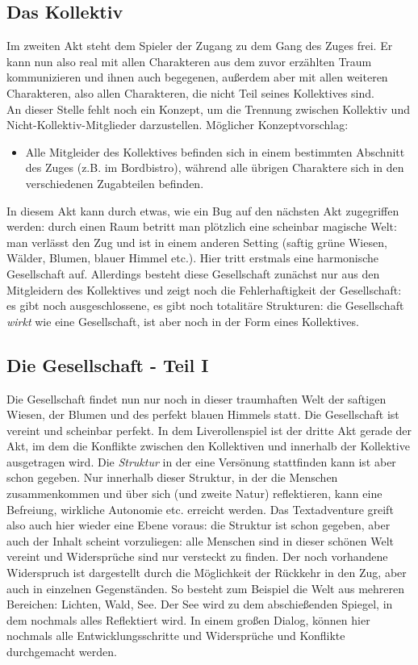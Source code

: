 \documentclass[a4paper, 12pt]{scrartcl}
\begin{document}
    \subsection{Das Kollektiv} \label{das-kollektiv}
    Im zweiten Akt steht dem Spieler der Zugang zu dem Gang des Zuges frei. 
    Er kann nun also real mit allen Charakteren aus dem zuvor erzählten Traum kommunizieren und ihnen auch begegenen, außerdem aber mit allen weiteren Charakteren, also allen Charakteren, die nicht Teil seines Kollektives sind. \\
    An dieser Stelle fehlt noch ein Konzept, um die Trennung zwischen Kollektiv und Nicht-Kollektiv-Mitglieder darzustellen.
    Möglicher Konzeptvorschlag:
    \begin{itemize}
    \item[] Alle Mitgleider des Kollektives befinden sich in einem bestimmten Abschnitt des Zuges (z.B. im Bordbistro), während alle übrigen Charaktere sich in den verschiedenen Zugabteilen befinden.
    \end{itemize}

    In diesem Akt kann durch etwas, wie ein Bug auf den nächsten Akt zugegriffen werden: 
    durch einen Raum betritt man plötzlich eine scheinbar magische Welt:
    man verlässt den Zug und ist in einem anderen Setting (saftig grüne Wiesen, Wälder, Blumen, blauer Himmel etc.).
    Hier tritt erstmals eine harmonische Gesellschaft auf. 
    Allerdings besteht diese Gesellschaft zunächst nur aus den Mitgleidern des Kollektives und zeigt noch die Fehlerhaftigkeit der Gesellschaft: es gibt noch ausgeschlossene, es gibt noch totalitäre Strukturen: die Gesellschaft \textit{wirkt} wie eine Gesellschaft, ist aber noch in der Form eines Kollektives. 

    \subsection{Die Gesellschaft - Teil I} \label{die-gesellschaft}
    Die Gesellschaft findet nun nur noch in dieser traumhaften Welt der saftigen Wiesen, der Blumen und des perfekt blauen Himmels statt. 
    Die Gesellschaft ist vereint und scheinbar perfekt. 
    In dem Liverollenspiel ist der dritte Akt gerade der Akt, im dem die Konflikte zwischen den Kollektiven und innerhalb der Kollektive ausgetragen wird. 
    Die \textit{Struktur} in der eine Versönung stattfinden kann ist aber schon gegeben. 
    Nur innerhalb dieser Struktur, in der die Menschen zusammenkommen und über sich (und zweite Natur) reflektieren, kann eine Befreiung, wirkliche Autonomie etc. erreicht werden.
    Das Textadventure greift also auch hier wieder eine Ebene voraus: die Struktur ist schon gegeben, aber auch der Inhalt scheint vorzuliegen: alle Menschen sind in dieser schönen Welt vereint und Widersprüche sind nur versteckt zu finden.
    Der noch vorhandene Widerspruch ist dargestellt durch die Möglichkeit der Rückkehr in den Zug, aber auch in einzelnen Gegenständen.
    So besteht zum Beispiel die Welt aus mehreren Bereichen: Lichten, Wald, See. 
    Der See wird zu dem abschießenden Spiegel, in dem nochmals alles Reflektiert wird.
    In einem großen Dialog, können hier nochmals alle Entwicklungsschritte und Widersprüche und Konflikte durchgemacht werden.
    
\end{document}
